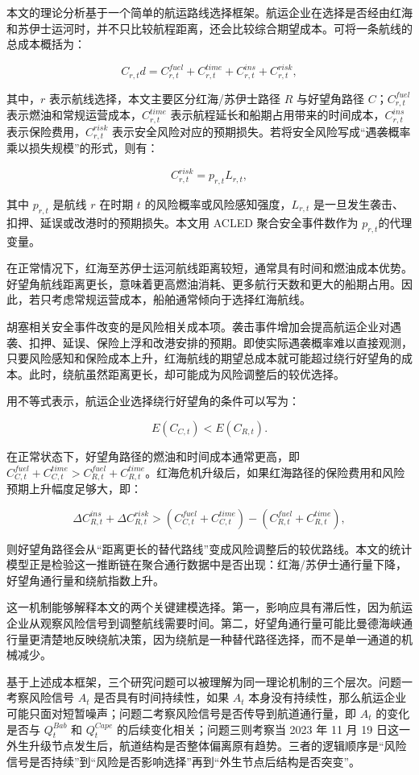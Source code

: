 \documentclass[
]{ctexart}
\begin{document}
本文的理论分析基于一个简单的航运路线选择框架。航运企业在选择是否经由红海和苏伊士运河时，并不只比较航程距离，还会比较综合期望成本。可将一条航线的总成本概括为：

\[
C_{r,t}d=C^{fuel}_{r,t}+C^{time}_{r,t}+C^{ins}_{r,t}+C^{risk}_{r,t},
\]

其中，\(r\) 表示航线选择，本文主要区分红海/苏伊士路径 \(R\) 与好望角路径
\(C\)；\(C^{fuel}_{r,t}\) 表示燃油和常规运营成本，\(C^{time}_{r,t}\)
表示航程延长和船期占用带来的时间成本，\(C^{ins}_{r,t}\)
表示保险费用，\(C^{risk}_{r,t}\)
表示安全风险对应的预期损失。若将安全风险写成``遇袭概率乘以损失规模''的形式，则有：

\[
C^{risk}_{r,t}=p_{r,t}L_{r,t},
\]

其中 \(p_{r,t}\) 是航线 \(r\) 在时期 \(t\)
的风险概率或风险感知强度，\(L_{r,t}\)
是一旦发生袭击、扣押、延误或改港时的预期损失。本文用 ACLED 聚合安全事件数作为 \(p_{r,t}\)的代理变量。

在正常情况下，红海至苏伊士运河航线距离较短，通常具有时间和燃油成本优势。好望角航线距离更长，意味着更高燃油消耗、更多航行天数和更大的船期占用。因此，若只考虑常规运营成本，船舶通常倾向于选择红海航线。

胡塞相关安全事件改变的是风险相关成本项。袭击事件增加会提高航运企业对遇袭、扣押、延误、保险上浮和改港安排的预期。即使实际遇袭概率难以直接观测，只要风险感知和保险成本上升，红海航线的期望总成本就可能超过绕行好望角的成本。此时，绕航虽然距离更长，却可能成为风险调整后的较优选择。

用不等式表示，航运企业选择绕行好望角的条件可以写为：

\[
E(C_{C,t}) < E(C_{R,t}).
\]

在正常状态下，好望角路径的燃油和时间成本通常更高，即
\(C^{fuel}_{C,t}+C^{time}_{C,t}>C^{fuel}_{R,t}+C^{time}_{R,t}\)。红海危机升级后，如果红海路径的保险费用和风险预期上升幅度足够大，即：

\[
\Delta C^{ins}_{R,t}+\Delta C^{risk}_{R,t}
>
\left(C^{fuel}_{C,t}+C^{time}_{C,t}\right)
-
\left(C^{fuel}_{R,t}+C^{time}_{R,t}\right),
\]

则好望角路径会从``距离更长的替代路线''变成风险调整后的较优路线。本文的统计模型正是检验这一推断链在聚合通行数据中是否出现：红海/苏伊士通行量下降，好望角通行量和绕航指数上升。

这一机制能够解释本文的两个关键建模选择。第一，影响应具有滞后性，因为航运企业从观察风险信号到调整航线需要时间。第二，好望角通行量可能比曼德海峡通行量更清楚地反映绕航决策，因为绕航是一种替代路径选择，而不是单一通道的机械减少。

基于上述成本框架，三个研究问题可以被理解为同一理论机制的三个层次。问题一考察风险信号
\(A_t\) 是否具有时间持续性，如果 \(A_t\)
本身没有持续性，那么航运企业可能只面对短暂噪声；问题二考察风险信号是否传导到航道通行量，即
\(A_t\) 的变化是否与 \(Q^{Bab}_t\) 和 \(Q^{Cape}_t\)
的后续变化相关；问题三则考察当 2023 年 11 月 19
日这一外生升级节点发生后，航道结构是否整体偏离原有趋势。三者的逻辑顺序是``风险信号是否持续''到``风险是否影响选择''再到``外生节点后结构是否突变''。
\end{document}

